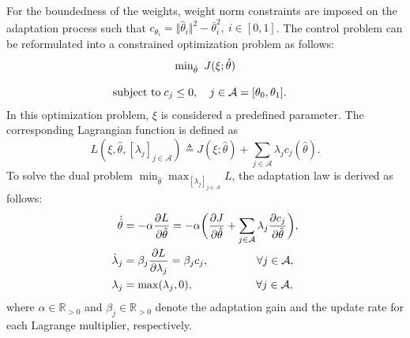 \documentclass[letterpaper, 10 pt, conference]{ieeeconf}  %
\begin{document}
For the boundedness of the weights, weight norm constraints are imposed on the adaptation process such that $c_{\theta_i}=\Vert\hat\theta_i\Vert^2-\bar\theta^2_i,\ i\in[0,1]$.
The control problem can be reformulated into a constrained optimization problem as follows:
\begin{equation*}
    \begin{matrix}
        \min_{\hat\theta} \ J(\xi;\hat\theta)
        \\ \\
        \begin{aligned}
        \text{subject to\;}&c_{j}\le0, \quad j\in\mathcal A = [\theta_0,\theta_1].
        \end{aligned}
    \end{matrix}
\end{equation*}
In this optimization problem, $\xi$ is considered a predefined parameter.
The corresponding Lagrangian function is defined as
\begin{equation}
    L(\xi,\hat\theta,[\lambda_j]_{j\in\mathcal A})\triangleq J(\xi;\hat\theta)+\sum_{j\in\mathcal A} \lambda_jc_j(\hat\theta)
    .
\end{equation}
To solve the dual problem $\min_{\hat\theta} \max_{[\lambda_j]_{j\in\mathcal A}}  L$, the adaptation law is derived as follows:
\begin{align}
        \dot {\hat\theta}&=-\alpha {\partial L\over\partial \hat\theta}
        =-\alpha 
        \bigg(
        {\partial J\over \partial \hat\theta}+\sum_{j\in\mathcal{A}}
        \lambda_j {\partial c_j\over \partial \hat\theta}
        \bigg),
    \label{eq. adaptation law th}
        \\
        \dot\lambda_j& = \beta_j{\partial L\over\partial \lambda_j} = \beta_j c_j ,
        \quad\quad\quad\quad      \      
        \forall j\in\mathcal A,
    \label{eq. adaptation law L}
        \\
        \lambda_j & = \max(\lambda_j,0) ,
        \quad\quad\quad\quad\ \ \ \ \ 
        \forall j\in\mathcal A,
    \label{eq. adaptation law L max}
\end{align}
where $\alpha\in\mathbb R_{>0}$ and $\beta_j\in\mathbb R_{>0}$ denote the adaptation gain and the update rate for each Lagrange multiplier, respectively.
\color{red}
\color{black}
\end{document}
